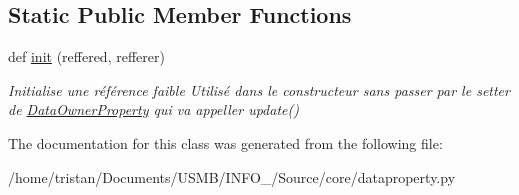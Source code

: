 \subsection*{Static Public Member Functions}
\begin{DoxyCompactItemize}
\item 
\mbox{\label{classSource_1_1core_1_1dataproperty_1_1DataOwnerProperty_a30a34a0351b370b8377b1ba028d47c15}} 
def \mbox{\hyperlink{classSource_1_1core_1_1dataproperty_1_1DataOwnerProperty_a30a34a0351b370b8377b1ba028d47c15}{init}} (reffered, refferer)
\begin{DoxyCompactList}\small\item\em Initialise une référence faible Utilisé dans le constructeur sans passer par le setter de \mbox{\hyperlink{classSource_1_1core_1_1dataproperty_1_1DataOwnerProperty}{Data\+Owner\+Property}} qui va appeller update() \end{DoxyCompactList}\end{DoxyCompactItemize}


The documentation for this class was generated from the following file\+:\begin{DoxyCompactItemize}
\item 
/home/tristan/\+Documents/\+U\+S\+M\+B/\+I\+N\+F\+O\+\_/\+Source/core/dataproperty.\+py\end{DoxyCompactItemize}
